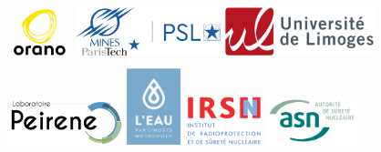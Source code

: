 \documentclass{article}
\begin{document}
\vspace{0.5 em}   
\begin{center}
\includegraphics[height = 40pt]{oranologo.png}
\hspace{0.3em}
\includegraphics[height = 40pt ]{logoMPT.png}
\hspace{0.3em}
\includegraphics[height = 40pt ]{logoUNILIM.png}
\hspace{0.3em}
\includegraphics[height = 40pt ]{Logo-PEIRENE.png}
\vspace{2 cm}
\includegraphics[height = 70pt ]{logoeaulimoges.png}
\hspace{0.3em}
\includegraphics[height = 40pt ]{logoIRSN.png} 
\hspace{0.3em}
\includegraphics[height = 40pt]{logo_ASN.png}
\end{center}


\newpage
{}
\setcounter{tocdepth}{2}
\tableofcontents
\end{document}
